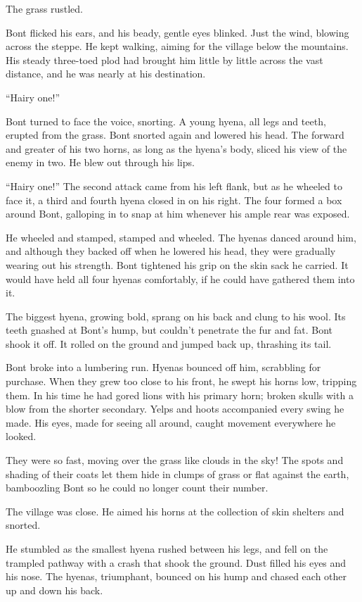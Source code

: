 

The grass rustled.

Bont flicked his ears, and his beady, gentle eyes blinked. Just the wind, blowing across the steppe. He kept walking, aiming for the village below the mountains. His steady three-toed plod had brought him little by little across the vast distance, and he was nearly at his destination.

``Hairy one!''

Bont turned to face the voice, snorting. A young hyena, all legs and teeth, erupted from the grass. Bont snorted again and lowered his head. The forward and greater of his two horns, as long as the hyena's body, sliced his view of the enemy in two. He blew out through his lips.

``Hairy one!'' The second attack came from his left flank, but as he wheeled to face it, a third and fourth hyena closed in on his right. The four formed a box around Bont, galloping in to snap at him whenever his ample rear was exposed.

He wheeled and stamped, stamped and wheeled. The hyenas danced around him, and although they backed off when he lowered his head, they were gradually wearing out his strength. Bont tightened his grip on the skin sack he carried. It would have held all four hyenas comfortably, if he could have gathered them into it.

The biggest hyena, growing bold, sprang on his back and clung to his wool. Its teeth gnashed at Bont's hump, but couldn't penetrate the fur and fat. Bont shook it off. It rolled on the ground and jumped back up, thrashing its tail.

Bont broke into a lumbering run. Hyenas bounced off him, scrabbling for purchase. When they grew too close to his front, he swept his horns low, tripping them. In his time he had gored lions with his primary horn; broken skulls with a blow from the shorter secondary. Yelps and hoots accompanied every swing he made. His eyes, made for seeing all around, caught movement everywhere he looked.

They were so fast, moving over the grass like clouds in the sky! The spots and shading of their coats let them hide in clumps of grass or flat against the earth, bamboozling Bont so he could no longer count their number.

The village was close. He aimed his horns at the collection of skin shelters and snorted.

He stumbled as the smallest hyena rushed between his legs, and fell on the trampled pathway with a crash that shook the ground. Dust filled his eyes and his nose. The hyenas, triumphant, bounced on his hump and chased each other up and down his back.

